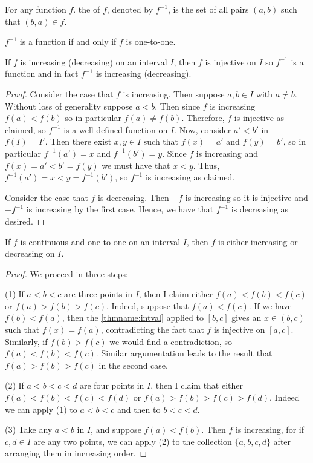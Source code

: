 \documentclass[12pt, a4paper, oneside, openright, titlepage]{book}
\begin{document}
\begin{defn}
    For any function $f$. the  of $f$, denoted by $f^{-1}$, is the set of all pairs $(a,b)$ such that $(b,a) \in f$.
\end{defn}

\begin{rmk}
    $f^{-1}$ is a function if and only if $f$ is one-to-one.
\end{rmk}


\begin{thm}
    If $f$ is increasing (decreasing) on an interval $I$, then $f$ is injective on $I$ so $f^{-1}$ is a function and in fact $f^{-1}$ is increasing (decreasing).
\end{thm}
\begin{proof}
    Consider the case that $f$ is increasing. Then suppose $a,b \in I$ with $a \neq b$. Without loss of generality suppose $a < b$. Then since $f$ is increasing $f(a) < f(b)$ so in particular $f(a) \neq f(b)$. Therefore, $f$ is injective as claimed, so $f^{-1}$ is a well-defined function on $I$. Now, consider $a' < b'$ in $f(I) = I'$. Then there exist $x,y \in I$ such that $f(x) = a'$ and $f(y) = b'$, so in particular $f^{-1}(a') = x$ and $f^{-1}(b') = y$. Since $f$ is increasing and $f(x) = a' < b' = f(y)$ we must have that $x < y$. Thus, $f^{-1}(a') = x < y = f^{-1}(b')$, so $f^{-1}$ is increasing as claimed.

    Consider the case that $f$ is decreasing. Then $-f$ is increasing so it is injective and $-f^{-1}$ is increasing by the first case. Hence, we have that $f^{-1}$ is decreasing as desired.
\end{proof}


\begin{thm}
    If $f$ is continuous and one-to-one on an interval $I$, then $f$ is either increasing or decreasing on $I$.
\end{thm}
\begin{proof}
    We proceed in three steps:

    (1) If $a < b < c$ are three points in $I$, then I claim either $f(a) < f(b) < f(c)$ or $f(a) > f(b) > f(c)$. Indeed, suppose that $f(a) < f(c)$. If we have $f(b) < f(a)$, then the \ref{thmname:intval} applied to $[b,c]$ gives an $x \in (b,c)$ such that $f(x) = f(a)$, contradicting the fact that $f$ is injective on $[a,c]$. Similarly, if $f(b) > f(c)$ we would find a contradiction, so $f(a) < f(b) < f(c)$. Similar argumentation leads to the result that $f(a) > f(b) > f(c)$ in the second case.


    (2) If $a < b < c < d$ are four points in $I$, then I claim that either $f(a) < f(b) < f(c) < f(d)$ or $f(a) > f(b) > f(c) > f(d)$. Indeed we can apply (1) to $a<b<c$ and then to $b < c < d$.


    (3) Take any $a < b$ in $I$, and suppose $f(a) < f(b)$. Then $f$ is increasing, for if $c,d \in I$ are any two points, we can apply (2) to the collection $\{a,b,c,d\}$ after arranging them in increasing order.
\end{proof}
\end{document}
